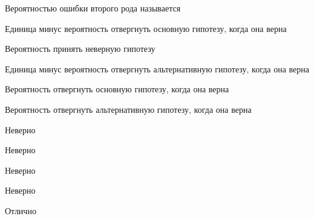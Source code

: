 
\begin{question}
Вероятностью ошибки второго рода называется
\begin{answerlist}
  \item Единица минус вероятность отвергнуть основную гипотезу, когда она верна
  \item Вероятность принять неверную гипотезу
  \item Единица минус вероятность отвергнуть альтернативную гипотезу, когда она
верна
  \item Вероятность отвергнуть основную гипотезу, когда она верна
  \item Вероятность отвергнуть альтернативную гипотезу, когда она верна
\end{answerlist}
\end{question}

\begin{solution}
\begin{answerlist}
  \item Неверно
  \item Неверно
  \item Неверно
  \item Неверно
  \item Отлично
\end{answerlist}
\end{solution}

